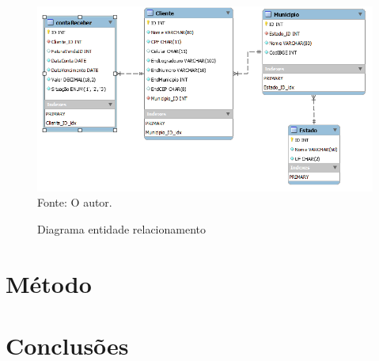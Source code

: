 \begin{figure}[h!]
  \caption{Diagrama entidade relacionamento}
  \includegraphics[width=\textwidth]{figure/diagram_EER.png}
  \label{fig:DER}
  {\fontsize{10pt}{\baselineskip}\selectfont
  Fonte: O autor.}
\end{figure}

\newpage

\section{Método}





\section{Conclusões}


